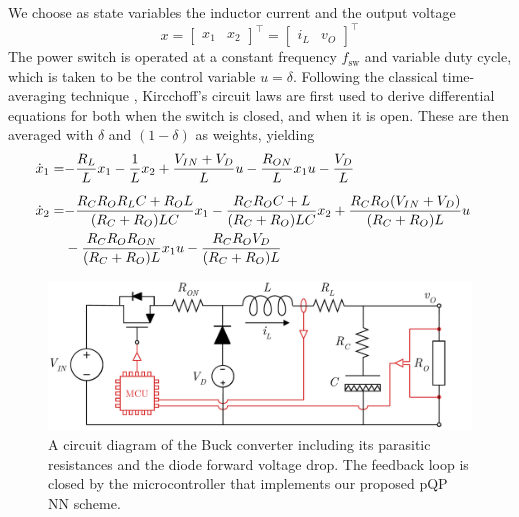 We choose as state variables the inductor current and the output voltage
\begin{equation}
	x = \begin{bmatrix} x_1 & x_2 \end{bmatrix}^\top
	= \begin{bmatrix} i_L & v_O \end{bmatrix}^\top
\end{equation}
The power switch is operated at a constant frequency $f_{\text{sw}}$ and variable duty cycle, which is taken to be the control variable $u = \delta$. Following the classical time-averaging technique \citep{middlebrook1976general}, Kircchoff's circuit laws are first used to derive differential equations for both when the switch is closed, and when it is open. These are then averaged with $\delta$ and $(1-\delta)$ as weights, yielding
\begin{subequations}
	\begin{flalign}
		\dot{x}_1 = & \small{-\frac{R_L}{L}x_1 - \frac{1}{L}x_2 + \frac{V_{IN}+V_D}{L}u - \frac{R_{ON}}{L} x_1 u - \frac{V_D}{L} \label{eq.x1}} && \\[5pt]
		\dot{x}_2 = & \small{-\frac{R_C R_O R_L C + R_O L}{(R_C + R_O) L C}x_1 -\frac{R_C R_O C + L}{(R_C + R_O)L C}} x_2 + \frac{R_C R_O (V_{IN} + V_D)}{(R_C+R_O)L} u  &&\nonumber \\
		&- \frac{R_C R_O R_{ON}}{(R_C + R_O)L} x_1 u - \frac{R_C R_O V_D}{(R_C + R_O)L} \label{eq.x2} && 
	\end{flalign}
\end{subequations}

\begin{figure}[t!]
	\centering
	\includegraphics[width=0.8\linewidth]{../images/chap4_buck_schematic.pdf}
	\caption{A circuit diagram of the Buck converter including its parasitic resistances and the diode forward voltage drop. The feedback loop is closed by the microcontroller that implements our proposed pQP NN scheme.}
	\label{fig:buck}
\end{figure}

